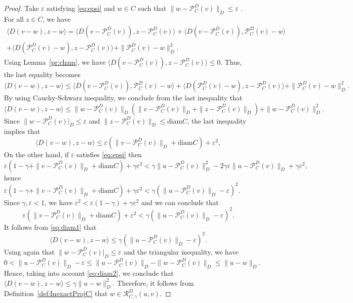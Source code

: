 \begin{proof}
	Take $\varepsilon$ satisfying \eqref{eq:epsi} and $w\in C$ such that  $\|w-\mathcal{P}_C^D(v)\|_D\leq \varepsilon$ . For all $z\in C$, we have
	\begin{multline*}
		\langle D(v-w), z-w \rangle = \langle D(v-\mathcal{P}_C^D(v)),z-\mathcal{P}_C^D(v) \rangle + \langle D(v-\mathcal{P}_C^D(v)), \mathcal{P}_C^D(v) -w \rangle\\
		+ \langle D(\mathcal{P}_C^D(v) - w), z- \mathcal{P}_C^D(v) \rangle +\| \mathcal{P}_C^D(v)-w\|_D^2.
	\end{multline*}
	Using Lemma~\ref{pr:cham},  we have $\langle D(v-\mathcal{P}_C^D(v)),z-\mathcal{P}_C^D(v) \rangle\leq 0$. Thus, the last equality becomes
	$$
		\langle D(v-w), z-w \rangle \leq \langle D(v-\mathcal{P}_C^D(v)), \mathcal{P}_C^D(v) -w \rangle + \langle D(\mathcal{P}_C^D(v) - w), z- \mathcal{P}_C^D(v) \rangle +\| \mathcal{P}_C^D(v)-w\|_D^2.
	$$
	By using Cauchy-Schwarz inequality, we conclude from the last inequality that
	$$
		\langle D(v-w), z-w \rangle \leq  \|w-\mathcal{P}_C^D(v) \|_D\left(\|v-\mathcal{P}_C^D(v)\|_D+ \|z- \mathcal{P}_C^D(v)\|_D\right) +\|w-\mathcal{P}_C^D(v)\|_D^2.
	$$
	Since $\|w-\mathcal{P}_C^D(v)|_D\leq \varepsilon$ and $ \|z- \mathcal{P}_C^D(v)\|_D\leq \mbox{diam} C$, the last inequality implies that
	\begin{equation}\label{eq:diam1}
		\langle D(v-w), z-w \rangle \leq \varepsilon \left(\|v-\mathcal{P}_C^D(v)\|_D+\mbox{diam}C\right)+\varepsilon^2,
	\end{equation}
	On the other hand, if $\varepsilon$ satisfies \eqref{eq:epsi} then
	$$
		\varepsilon \left( 1-\gamma+\|v-\mathcal{P}_C^D(v)\|_D+ \mbox{diam} C\right) + \gamma \varepsilon^2 <
		\gamma\|u-\mathcal{P}_C^D(v)\|_D^2-2	\gamma\varepsilon\|u-\mathcal{P}_C^D(v)\|_D +\gamma\varepsilon^2,
	$$
	hence
	$
		\varepsilon \left( 1-\gamma+\|v-\mathcal{P}_C^D(v)\|_D+ \mbox{diam} C\right) + \gamma \varepsilon^2 < \gamma\left(\|u-\mathcal{P}_C^D(v)\|_D-\varepsilon\right)^2.
	$
	Since $\gamma, \varepsilon<1$, we have  $\varepsilon^2 < \varepsilon(1-\gamma) + \gamma \varepsilon^2$ and we can conclude that
	$$
		\varepsilon \left( \|v-\mathcal{P}_C^D(v)\|_D+ \mbox{diam} C\right) + \varepsilon^2 <
		\gamma\left(\|u-\mathcal{P}_C^D(v)\|_D-\varepsilon\right)^2.
	$$
	It follows from \eqref{eq:diam1} that
	\begin{equation}\label{eq:diam2}
		\langle D(v-w), z-w \rangle \leq \gamma\left(\|u-\mathcal{P}_C^D(v)\|_D-\varepsilon\right)^2.
	\end{equation}
	Using again that $\|w-\mathcal{P}_C^D(v)|_D\leq \varepsilon$ and the triangular inequality, we have
	$$
		0<\|u-\mathcal{P}_C^D(v)\|_D -\varepsilon \leq \|u-\mathcal{P}_C^D(v)\|_D -\|w-\mathcal{P}_C^D(v)\|_D \leq \|u-w\|_D.
	$$
	Hence,   taking into account  \eqref{eq:diam2}, we conclude that $	\langle D(v-w), z-w \rangle \leq \gamma\|u-w\|_D^2$. Therefore, it follows from Definition~\ref{def:InexactProjC} that    $w\in\mathcal{R}_{C,\gamma}^D(u, v)$.
\end{proof}
